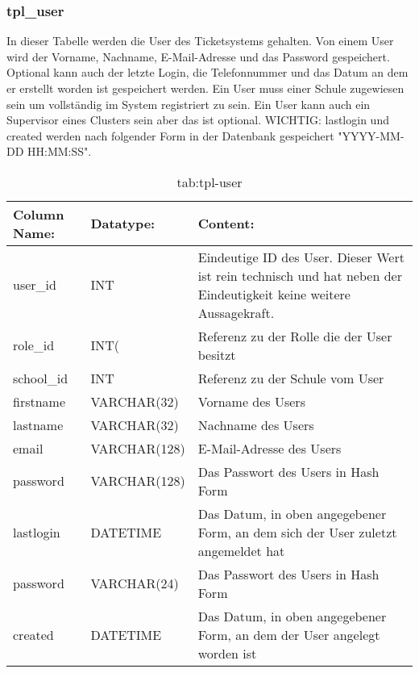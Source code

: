 \newpage

\subsubsection{tpl\_user}

In dieser Tabelle werden die User des Ticketsystems gehalten. Von einem User wird der Vorname, Nachname, E-Mail-Adresse und das Password gespeichert. Optional kann auch der letzte Login, die Telefonnummer und das Datum an dem er erstellt worden ist gespeichert werden.
Ein User muss einer Schule zugewiesen sein um vollständig im System registriert zu sein. Ein User kann auch ein Supervisor eines Clusters sein aber das ist optional.
WICHTIG: lastlogin und created werden nach folgender Form in der Datenbank gespeichert "YYYY-MM-DD HH:MM:SS".

\begin{table}[h]
	\begin{tabular}{|p{3.5cm}|p{4cm}|p{6.2cm}|}
		\hline
		\textbf{Column Name:} & \textbf{Datatype:} & \textbf{Content:}\\
		\hline
		user\_id & INT & Eindeutige ID des User. Dieser Wert ist rein technisch und hat  neben der Eindeutigkeit keine weitere Aussagekraft.\\
		\hline
		role\_id & INT( & Referenz zu der Rolle die der User besitzt\\
		\hline
		school\_id & INT &  Referenz zu der Schule vom User \\
		\hline
		firstname & VARCHAR(32) & Vorname des Users\\
		\hline
		lastname & VARCHAR(32) & Nachname des Users\\
		\hline
		email & VARCHAR(128) & E-Mail-Adresse des Users\\
		\hline
		password & VARCHAR(128) & Das Passwort des Users in Hash Form \\
		\hline
		lastlogin & DATETIME & Das Datum, in oben angegebener Form, an dem sich der User zuletzt angemeldet hat \\
		\hline
		password & VARCHAR(24) & Das Passwort des Users in Hash Form \\
		\hline
		created & DATETIME & Das Datum, in oben angegebener Form, an dem der User angelegt worden ist\\
		\hline
	\end{tabular}
	\caption{tab:tpl-user}
\end{table}
\label{tab:tpl_user}

\newpage

